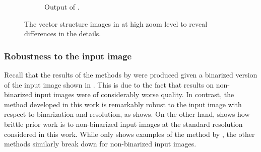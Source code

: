 \begin{figure}[h]
\begin{subfigure}{.49\textwidth}
    \caption{Output of \citet{mo2021virtualsketching}.}
    \end{subfigure}
    \caption{The vector structure images in  at high zoom level to reveal differences in the details.}
    \label{fig:tonari-full_42_full.order.zoom}
\end{figure}

\clearpage
\subsubsection{Robustness to the input image}

Recall that the results of the methods by \citet{Puhachov2021KeypointPolyvector,mo2021virtualsketching,autotrace} were produced given a binarized version of the input image shown in . This is due to the fact that results on non-binarized input images were of considerably worse quality. In contrast, the method developed in this  work is remarkably robust to the input image with respect to binarization and resolution, as  shows. On the other hand,  shows how brittle prior work is to non-binarized input images at the standard resolution considered in this work. While  only shows examples of the method by \citet{Puhachov2021KeypointPolyvector}, the other methods similarly break down for non-binarized input images.

